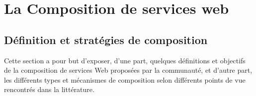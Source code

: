\chapter{La Composition de services web}



  


\newpage

  \section{Définition et stratégies de composition}
  \label{sec:defin-et-caract}

  Cette section a pour but d'exposer, d'une part, quelques définitions
  et objectifs de la composition de services Web proposées par la
  communauté, et d'autre part, les différents types et mécanismes de
  composition selon différents points de vue rencontrés dans la
  littérature.
  
